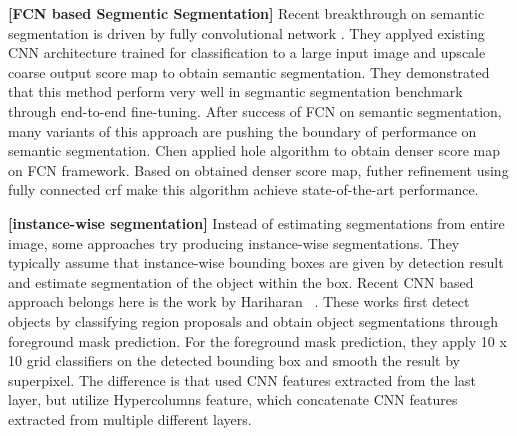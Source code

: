 \documentclass[10pt,twocolumn,letterpaper]{article}
\begin{document}
{\bf[FCN based Segmentic Segmentation]}
Recent breakthrough on semantic segmentation is driven by fully convolutional network \cite{Fcn}.
They applyed existing CNN architecture trained for classification to a large input image and upscale coarse output score map to obtain semantic segmentation.
They demonstrated that this method perform very well in segmantic segmentation benchmark through end-to-end fine-tuning.
After success of FCN on semantic segmentation, many variants of this approach are pushing the boundary of performance on semantic segmentation. 
Chen \etal \cite{Deeplabcrf} applied hole algorithm to obtain denser score map on FCN framework.
Based on obtained denser score map, futher refinement using fully connected crf \cite{Fullycrf} make this algorithm achieve state-of-the-art performance.
















{\bf[instance-wise segmentation]}
Instead of estimating segmentations from entire image, some approaches try producing instance-wise segmentations. 
They typically assume that instance-wise bounding boxes are given by detection result and estimate segmentation of the object within the box.
Recent CNN based approach belongs here is the work by Hariharan \etal~\cite{Sds, Hypercolumns}.
These works first detect objects by classifying region proposals and obtain object segmentations through foreground mask prediction.
For the foreground mask prediction, they apply 10 x 10 grid classifiers on the detected bounding box and smooth the result by superpixel.
The difference is that \cite{Sds} used CNN features extracted from the last layer, but \cite{Hypercolumns} utilize Hypercolumns feature, which concatenate CNN features extracted from multiple different layers.
\fi







\iffalse
Several previous works model object's shape for  segmentation.
One of basic approach that model shape is the work by Yang \etal~\cite{Layeredobject}.
They model target object's shape as mixture of shape priors defined on each part filters.
Though this representation is very helpful for robust segmentation, the performance is limited as this model is not flexible enough to model high variance of object's shape.
To deal with this problem, deep neural network (DNN) based approach is emerged ~\cite{Shapeboltzmann, Generativeseg, Augcrf}.
These models train boltzmann machine to learn the shape prior from segmentation mask.
The final line of work is training DNN in a supervised way. 
Luo \etal~\cite{Pedparsing} train DNN to generate pedestrian's part mask from low level features.
\fi
\end{document}
